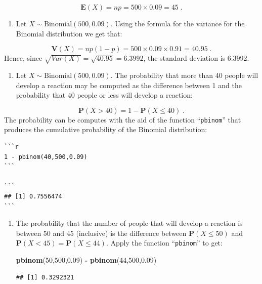 \documentclass[
]{krantz}
\makeatletter
\newenvironment{Shaded}{\begin{snugshade}}{\end{snugshade}}
\newcommand{\DecValTok}[1]{\textcolor[rgb]{0.00,0.00,0.81}{#1}}
\newcommand{\FloatTok}[1]{\textcolor[rgb]{0.00,0.00,0.81}{#1}}
\newcommand{\KeywordTok}[1]{\textcolor[rgb]{0.13,0.29,0.53}{\textbf{#1}}}
\newcommand{\NormalTok}[1]{#1}
\newcommand{\OperatorTok}[1]{\textcolor[rgb]{0.81,0.36,0.00}{\textbf{#1}}}
\newcommand{\StringTok}[1]{\textcolor[rgb]{0.31,0.60,0.02}{#1}}
\providecommand{\tightlist}{%
  \setlength{\itemsep}{0pt}\setlength{\parskip}{0pt}}
\newcommand{\Expec}{\mathbf{E}}
\newcommand{\Prob}{\mathbf{P}}
\newcommand{\Var}{\mathbf{V}}
\newenvironment{kframe}{%
\medskip{}
\setlength{\fboxsep}{.8em}
 \def\at@end@of@kframe{}%
 \ifinner\ifhmode%
  \def\at@end@of@kframe{\end{minipage}}%
  \begin{minipage}{\columnwidth}%
 \fi\fi%
 \def\FrameCommand##1{\hskip\@totalleftmargin \hskip-\fboxsep
 \colorbox{shadecolor}{##1}\hskip-\fboxsep
     \hskip-\linewidth \hskip-\@totalleftmargin \hskip\columnwidth}%
 \MakeFramed {\advance\hsize-\width
   \@totalleftmargin\z@ \linewidth\hsize
   \@setminipage}}%
 {\par\unskip\endMakeFramed%
 \at@end@of@kframe}
\renewenvironment{Shaded}{\begin{kframe}}{\end{kframe}}
\theoremstyle{definition}
\theoremstyle{definition}
\theoremstyle{definition}
\theoremstyle{remark}
\makeatother
\begin{document}
\[\Expec(X) = n p = 500 \times 0.09 = 45\;.\]

\begin{enumerate}
\def\labelenumi{\arabic{enumi}.}
\setcounter{enumi}{1}
\tightlist
\item
  Let
  \(X \sim \mbox{Binomial}(500,0.09)\). Using the formula for the variance
  for the Binomial distribution we get that:
\end{enumerate}

\[\Var(X) = n p(1-p) = 500 \times 0.09\times 0.91 = 40.95\;.\] Hence,
since \(\sqrt{Var(X)} = \sqrt{40.95} = 6.3992\), the standard deviation is
6.3992.

\begin{enumerate}
\def\labelenumi{\arabic{enumi}.}
\setcounter{enumi}{2}
\tightlist
\item
  Let
  \(X \sim \mbox{Binomial}(500,0.09)\). The probability that more than 40
  people will develop a reaction may be computed as the difference between
  1 and the probability that 40 people or less will develop a reaction:
\end{enumerate}

\[\Prob(X > 40) = 1- \Prob(X \leq 40)\;.\] The probability can be
computes with the aid of the function ``\texttt{pbinom}'' that produces the
cumulative probability of the Binomial distribution:

\begin{verbatim}
```r
1 - pbinom(40,500,0.09)
```

```
## [1] 0.7556474
```
\end{verbatim}

\begin{enumerate}
\def\labelenumi{\arabic{enumi}.}
\setcounter{enumi}{3}
\item
  The probability that the number of
  people that will develop a reaction is between 50 and 45 (inclusive) is
  the difference between \(\Prob(X\leq 50)\) and
  \(\Prob(X < 45) = \Prob(X \leq 44)\). Apply the function ``\texttt{pbinom}'' to
  get:

\begin{Shaded}
\begin{Highlighting}[]
\KeywordTok{pbinom}\NormalTok{(}\DecValTok{50}\NormalTok{,}\DecValTok{500}\NormalTok{,}\FloatTok{0.09}\NormalTok{) }\OperatorTok{-}\StringTok{ }\KeywordTok{pbinom}\NormalTok{(}\DecValTok{44}\NormalTok{,}\DecValTok{500}\NormalTok{,}\FloatTok{0.09}\NormalTok{)}
\end{Highlighting}
\end{Shaded}

\begin{verbatim}
## [1] 0.3292321
\end{verbatim}
\end{enumerate}
\end{document}

